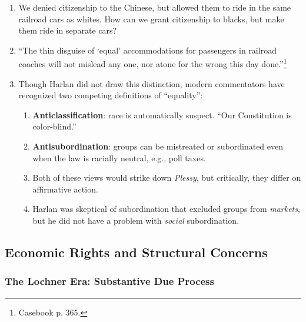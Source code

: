 \begin{enumerate}
\begin{enumerate}
        law.''\footnote{Casebook p. 364.} Law \emph{does} cause group 
        inequality.
        \item We denied citizenship to the Chinese, but allowed them to ride in 
        the same railroad cars as whites. How can we grant citizenship to 
        blacks, but make them ride in separate cars?
        \item ``The thin disguise of `equal' accommodations for passengers in 
        railroad coaches will not mislead any one, nor atone for the wrong this 
        day done.''\footnote{Casebook p. 365.}
        \item Though Harlan did not draw this distinction, modern commentators 
        have recognized two competing definitions of ``equality'':
        \begin{enumerate}
            \item \textbf{Anticlassification}: race is automatically suspect. 
            ``Our Constitution is color-blind.''
            \item \textbf{Antisubordination}: groups can be mistreated or 
            subordinated even when the law is racially neutral, e.g., poll 
            taxes.
            \item Both of these views would strike down \emph{Plessy}, but 
            critically, they differ on affirmative action.
            \item Harlan was skeptical of subordination that excluded groups 
            from \emph{markets}, but he did not have a problem with 
            \emph{social} subordination.
        \end{enumerate}
    \end{enumerate}
\end{enumerate}

% 
% 
\subsection{Economic Rights and Structural Concerns}

\subsubsection{The Lochner Era: Substantive Due Process} 

